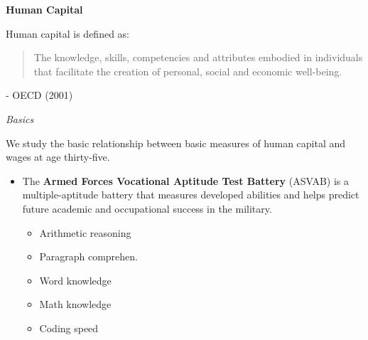 \begin{frame}\begin{center}
    \LARGE\textbf{Human Capital}
\end{center}\end{frame}
\begin{frame}
Human capital is defined as:
\vspace{\baselineskip}

\begin{quote}
The knowledge, skills, competencies and attributes embodied in individuals that facilitate
the creation of personal, social and economic well-being.
\end{quote}\vspace{-0.5pt} \hspace{6cm} - OECD (2001)
\end{frame}
\begin{frame}\begin{center}
\LARGE\textit{Basics}
\end{center}\end{frame}
\begin{frame}
We study the basic relationship between basic measures of human capital and wages at age thirty-five.
\end{frame}
\begin{frame}
\begin{itemize}
\item The \textbf{Armed Forces Vocational Aptitude Test Battery} (ASVAB) is a multiple-aptitude battery that measures developed abilities and helps predict future academic and occupational success in the military.
\begin{multicols}{2}
\begin{itemize}\setlength\itemsep{1em}
\item Arithmetic reasoning
\item Paragraph comprehen.
\item Word knowledge
\item Math knowledge
\item Coding speed
\end{itemize}
\end{multicols}
\end{itemize}

\end{frame}
